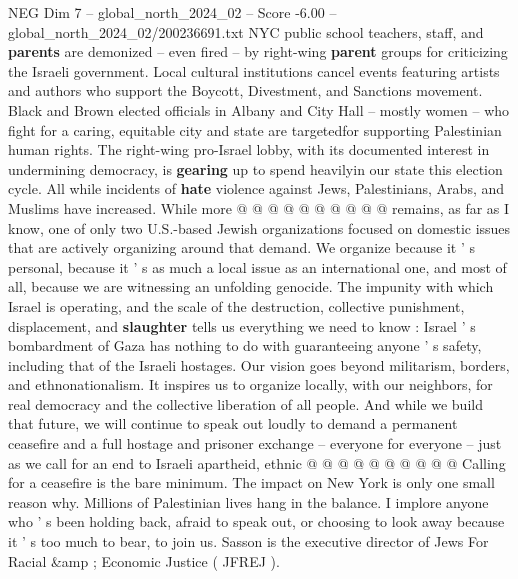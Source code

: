 \begin{textsample}{NEG Dim 7 – global\_north\_2024\_02 – Score -6.00 – global\_north\_2024\_02/200236691.txt}
NYC public school teachers, staff, and \textbf{parents} are demonized -- even fired -- by right-wing \textbf{parent} groups for criticizing the Israeli government.
Local cultural institutions cancel events featuring artists and authors who support the Boycott, Divestment, and Sanctions movement.
Black and Brown elected officials in Albany and City Hall -- mostly women -- who fight for a caring, equitable city and state are targetedfor supporting Palestinian human rights.
The right-wing pro-Israel lobby, with its documented interest in undermining democracy, is \textbf{gearing} up to spend heavilyin our state this election cycle.
All while incidents of \textbf{hate} violence against Jews, Palestinians, Arabs, and Muslims have increased.
While more @ @ @ @ @ @ @ @ @ @ remains, as far as I know, one of only two U.S.-based Jewish organizations focused on domestic issues that are actively organizing around that demand.
We organize because it ' s personal, because it ' s as much a local issue as an international one, and most of all, because we are witnessing an unfolding genocide.
The impunity with which Israel is operating, and the scale of the destruction, collective punishment, displacement, and \textbf{slaughter} tells us everything we need to know : Israel ' s bombardment of Gaza has nothing to do with guaranteeing anyone ' s safety, including that of the Israeli hostages.
Our vision goes beyond militarism, borders, and ethnonationalism.
It inspires us to organize locally, with our neighbors, for real democracy and the collective liberation of all people.
And while we build that future, we will continue to speak out loudly to demand a permanent ceasefire and a full hostage and prisoner exchange -- everyone for everyone -- just as we call for an end to Israeli apartheid, ethnic @ @ @ @ @ @ @ @ @ @ Calling for a ceasefire is the bare minimum.
The impact on New York is only one small reason why.
Millions of Palestinian lives hang in the balance.
I implore anyone who ' s been holding back, afraid to speak out, or choosing to look away because it ' s too much to bear, to join us.
Sasson is the executive director of Jews For Racial \&amp ; Economic Justice ( JFREJ ).

\end{textsample}
